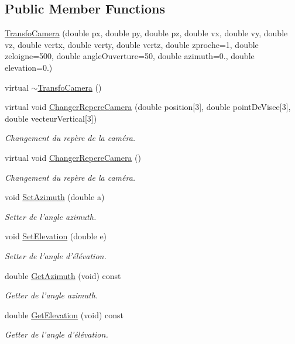 \subsection*{Public Member Functions}
\begin{DoxyCompactItemize}
\item 
\hyperlink{class_transfo_camera_a3543cac1c73f91389a7509c6a6baf5f2}{Transfo\+Camera} (double px, double py, double pz, double vx, double vy, double vz, double vertx, double verty, double vertz, double zproche=1, double zeloigne=500, double angle\+Ouverture=50, double azimuth=0., double elevation=0.)
\item 
virtual \hyperlink{class_transfo_camera_af1f4189a386127ee63b29b392c0a8b41}{$\sim$\+Transfo\+Camera} ()
\item 
virtual void \hyperlink{class_transfo_camera_af56c28b564652b71b7040084aaec8ff9}{Changer\+Repere\+Camera} (double position\mbox{[}3\mbox{]}, double point\+De\+Visee\mbox{[}3\mbox{]}, double vecteur\+Vertical\mbox{[}3\mbox{]})
\begin{DoxyCompactList}\small\item\em Changement du repère de la caméra. \end{DoxyCompactList}\item 
virtual void \hyperlink{class_transfo_camera_a1d02bd6398256954713d1c239d2ebcba}{Changer\+Repere\+Camera} ()
\begin{DoxyCompactList}\small\item\em Changement du repère de la caméra. \end{DoxyCompactList}\item 
void \hyperlink{class_transfo_camera_af6df80037a1b33cecd28672255c38f1f}{Set\+Azimuth} (double a)
\begin{DoxyCompactList}\small\item\em Setter de l'angle azimuth. \end{DoxyCompactList}\item 
void \hyperlink{class_transfo_camera_a4e1dc4a565df1976c07ebbbf011427b8}{Set\+Elevation} (double e)
\begin{DoxyCompactList}\small\item\em Setter de l'angle d'élévation. \end{DoxyCompactList}\item 
double \hyperlink{class_transfo_camera_a8c2f48af070cc18d0f0c33cb3edbcf72}{Get\+Azimuth} (void) const 
\begin{DoxyCompactList}\small\item\em Getter de l'angle azimuth. \end{DoxyCompactList}\item 
double \hyperlink{class_transfo_camera_aed836872b472780c197b9fd3f4b4f1a8}{Get\+Elevation} (void) const 
\begin{DoxyCompactList}\small\item\em Getter de l'angle d'élévation. \end{DoxyCompactList}\end{DoxyCompactItemize}

